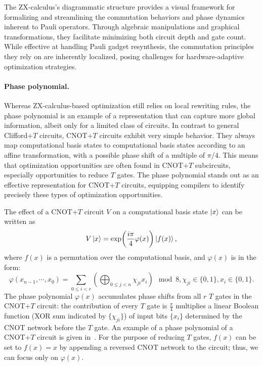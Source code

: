\documentclass[a4paper,onecolumn,11pt,unpublished]{quantumarticle}
\begin{document}
The ZX-calculus's diagrammatic structure provides a visual framework for formalizing and streamlining the commutation behaviors and phase dynamics inherent to Pauli operators. Through algebraic manipulations and graphical transformations, they facilitate minimizing both circuit depth and gate count. While effective at handling Pauli gadget resynthesis, the commutation principles they rely on are inherently localized, posing challenges for hardware-adaptive optimization strategies.


\paragraph{Phase polynomial.} Whereas ZX-calculus-based optimization still relies on local rewriting rules, the phase polynomial is an example of a representation that can capture more global information, albeit only for a limited class of circuits. In contrast to general Clifford+$T$ circuits, CNOT+$T$ circuits exhibit very simple behavior. They always map computational basis states to computational basis states according to an affine transformation, with a possible phase shift of a multiple of $\pi/4$. This means that optimization opportunities are often found in CNOT+$T$ subcircuits, especially opportunities to reduce $T$ gates. The phase polynomial stands out as an effective representation for CNOT+$T$ circuits, equipping compilers to identify precisely these types of optimization opportunities.

The effect of a CNOT+$T$ circuit $V$ on a computational basis state $\ket{x}$ can be written as 
\begin{equation}
  V\ket{x} = \exp(\frac{i\pi}{4} \varphi(x))\ket{f(x)},
\end{equation}
where $f(x)$ is a permutation over the computational basis, and $\varphi(x)$ is in the form:
\begin{equation}
\label{eq:phase_polynomial_gate}
\varphi(x_{n-1}, \cdots, x_0) = \sum_{0\leq i < r} \left(\bigoplus_{0 \leq j < n} \chi_{ji}x_i\right) \mod 8, \chi_{ji}\in \{0, 1\}, x_i\in \{0, 1\}.
\end{equation}
The phase polynomial $\varphi(x)$ accumulates phase shifts from all $r$ $T$ gates in the CNOT+$T$ circuit: the contribution of every $T$ gate is $\frac{\pi}{4}$ multiplies a linear Boolean function (XOR sum indicated by $\{\chi_{ji}\}$) of input bits $\{x_i\}$ determined by the CNOT network before the $T$ gate. An example of a phase polynomial of a CNOT+$T$ circuit is given in~.
For the purpose of reducing $T$ gates, $f(x)$ can be set to $f(x)=x$ by appending a reversed CNOT network to the circuit; thus, we can focus only on $\varphi(x)$. 
\end{document}
